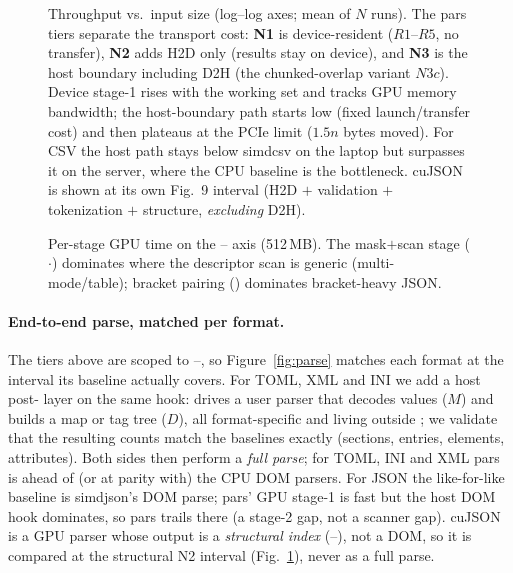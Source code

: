 \begin{figure}[t]
\centering
{}
\caption{Throughput vs.\ input size (log--log axes; mean of $N$ runs).  The pars
tiers separate the transport cost: \textbf{N1} is device-resident ($R1$--$R5$,
no transfer), \textbf{N2} adds H2D only (results stay on device), and
\textbf{N3} is the host boundary including D2H (the chunked-overlap variant
$N3c$).  Device stage-1 rises with the working set and tracks GPU memory
bandwidth; the host-boundary path starts low (fixed launch/transfer cost) and
then plateaus at the PCIe limit ($1.5n$ bytes moved).  For CSV the host path
stays below \textsf{simdcsv} on the laptop but surpasses it on the server, where
the CPU baseline is the bottleneck.  \textsf{cuJSON} is shown at its own Fig.~9
interval (H2D $+$ validation $+$ tokenization $+$ structure, \emph{excluding}
D2H).}
\label{fig:scaling}
\end{figure}

\begin{figure}[t]
\centering
{}
\caption{Per-stage GPU time on the \Rone--\Rsix{} axis (512\,MB).  The
mask$+$scan stage (\Rtwo$\cdot$\Rfour) dominates where the descriptor scan is
generic (multi-mode/table); bracket pairing (\Rsix) dominates bracket-heavy
JSON.}
\label{fig:stages}
\end{figure}

\paragraph{End-to-end parse, matched per format.}
The tiers above are scoped to \Rone--\Rsix, so Figure~\ref{fig:parse} matches
each format at the interval its baseline actually covers.  For TOML, XML and INI
we add a host post-\Rsix{} layer on the same hook:  drives a user
parser that decodes values ($M$) and builds a map or tag tree ($D$), all
format-specific and living outside ; we validate that the
resulting counts match the baselines exactly (sections, entries, elements,
attributes).  Both sides then perform a \emph{full parse}; for TOML, INI and XML
pars is ahead of (or at parity with) the CPU DOM parsers.  For JSON the
like-for-like baseline is
\textsf{simdjson}'s DOM parse; pars' GPU stage-1 is fast but the host DOM hook
dominates, so pars trails there (a stage-2 gap, not a scanner gap).
\textsf{cuJSON} is a GPU parser whose output is a \emph{structural index}
(\Rone--\Rsix), not a DOM, so it is compared at the structural N2 interval
(Fig.~\ref{fig:scaling}), never as a full parse.


